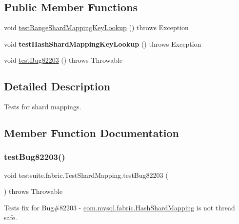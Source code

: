 \subsection*{Public Member Functions}
\begin{DoxyCompactItemize}
\item 
void \mbox{\hyperlink{classtestsuite_1_1fabric_1_1_test_shard_mapping_a6b77d1255324c5140498ebae4aed5030}{test\+Range\+Shard\+Mapping\+Key\+Lookup}} ()  throws Exception 
\item 
\mbox{\label{classtestsuite_1_1fabric_1_1_test_shard_mapping_ac378cb3174076c7221b42cf2226ca26e}} 
void {\bfseries test\+Hash\+Shard\+Mapping\+Key\+Lookup} ()  throws Exception 
\item 
void \mbox{\hyperlink{classtestsuite_1_1fabric_1_1_test_shard_mapping_afacc92744572b4f3b5e5776e34e08f21}{test\+Bug82203}} ()  throws Throwable 
\end{DoxyCompactItemize}


\subsection{Detailed Description}
Tests for shard mappings. 

\subsection{Member Function Documentation}
\mbox{\label{classtestsuite_1_1fabric_1_1_test_shard_mapping_afacc92744572b4f3b5e5776e34e08f21}} 
\subsubsection{\texorpdfstring{test\+Bug82203()}{testBug82203()}}
{\footnotesize\ttfamily void testsuite.\+fabric.\+Test\+Shard\+Mapping.\+test\+Bug82203 (\begin{DoxyParamCaption}{ }\end{DoxyParamCaption}) throws Throwable}

Tests fix for Bug\#82203 -\/ \mbox{\hyperlink{classcom_1_1mysql_1_1fabric_1_1_hash_shard_mapping}{com.\+mysql.\+fabric.\+Hash\+Shard\+Mapping}} is not thread safe.

